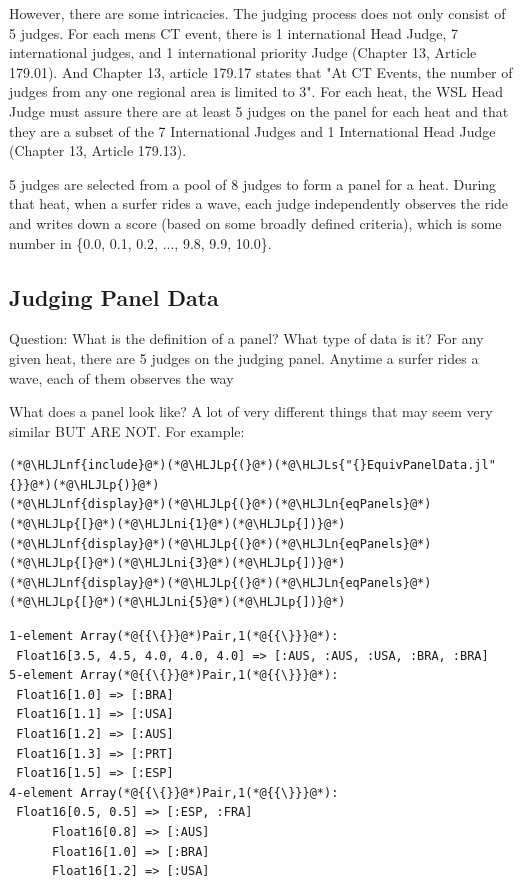 \documentclass[12pt,a4paper]{article}
\newcommand{\HLJLn}[1]{#1}
\newcommand{\HLJLnf}[1]{\textcolor[RGB]{66,102,213}{#1}}
\newcommand{\HLJLs}[1]{\textcolor[RGB]{201,61,57}{#1}}
\newcommand{\HLJLni}[1]{\textcolor[RGB]{59,151,46}{#1}}
\newcommand{\HLJLp}[1]{#1}
\begin{document}
However, there are some intricacies. The judging process does not only consist of 5 judges. For each mens CT event, there is 1 international Head Judge, 7 international judges, and 1 international priority Judge (Chapter 13, Article 179.01). And Chapter 13, article 179.17 states that "At CT Events, the number of judges from any one regional area is limited to 3". For each heat, the WSL Head Judge must assure there are at least 5 judges on the panel for each heat and that they are a subset of the 7 International Judges and 1 International Head Judge (Chapter 13, Article 179.13).


5 judges are selected from a pool of 8 judges to form a panel for a heat. During that heat, when a surfer rides a wave, each judge independently observes the ride and writes down a score (based on some broadly defined criteria), which is some number in \{0.0, 0.1, 0.2, ..., 9.8, 9.9, 10.0\}.


\subsection{Judging Panel Data}
Question: What is the definition of a panel? What type of data is it? For any given heat, there are 5 judges on the judging panel. Anytime a surfer rides a wave, each of them observes the way 

What does a panel look like? A lot of very different things that may seem very similar BUT ARE NOT. For example:


\begin{lstlisting}
(*@\HLJLnf{include}@*)(*@\HLJLp{(}@*)(*@\HLJLs{"{}EquivPanelData.jl"{}}@*)(*@\HLJLp{)}@*)
(*@\HLJLnf{display}@*)(*@\HLJLp{(}@*)(*@\HLJLn{eqPanels}@*)(*@\HLJLp{[}@*)(*@\HLJLni{1}@*)(*@\HLJLp{])}@*)
(*@\HLJLnf{display}@*)(*@\HLJLp{(}@*)(*@\HLJLn{eqPanels}@*)(*@\HLJLp{[}@*)(*@\HLJLni{3}@*)(*@\HLJLp{])}@*)
(*@\HLJLnf{display}@*)(*@\HLJLp{(}@*)(*@\HLJLn{eqPanels}@*)(*@\HLJLp{[}@*)(*@\HLJLni{5}@*)(*@\HLJLp{])}@*)
\end{lstlisting}

\begin{lstlisting}
1-element Array(*@{{\{}}@*)Pair,1(*@{{\}}}@*):
 Float16[3.5, 4.5, 4.0, 4.0, 4.0] => [:AUS, :AUS, :USA, :BRA, :BRA]
5-element Array(*@{{\{}}@*)Pair,1(*@{{\}}}@*):
 Float16[1.0] => [:BRA]
 Float16[1.1] => [:USA]
 Float16[1.2] => [:AUS]
 Float16[1.3] => [:PRT]
 Float16[1.5] => [:ESP]
4-element Array(*@{{\{}}@*)Pair,1(*@{{\}}}@*):
 Float16[0.5, 0.5] => [:ESP, :FRA]
      Float16[0.8] => [:AUS]
      Float16[1.0] => [:BRA]
      Float16[1.2] => [:USA]
\end{lstlisting}
\end{document}
